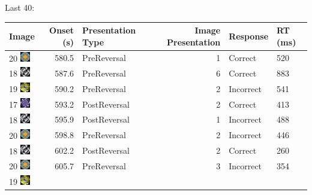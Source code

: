\documentclass[]{article}
\begin{document}
Last 40:

\begin{longtable}[]{@{}lrlrll@{}}
\toprule
Image & Onset (s) & Presentation Type & Image Presentation & Response &
RT (ms)\tabularnewline
\midrule
\endhead
20
\includegraphics[width=0.16670in,height=0.16670in]{../ReversalLearning_20130621/images/abs20.jpg}
& 580.5 & PreReversal & 1 & Correct & 520\tabularnewline
18
\includegraphics[width=0.16670in,height=0.16670in]{../ReversalLearning_20130621/images/abs18.jpg}
& 587.6 & PreReversal & 6 & Correct & 883\tabularnewline
19
\includegraphics[width=0.16670in,height=0.16670in]{../ReversalLearning_20130621/images/abs19.jpg}
& 590.2 & PreReversal & 2 & Incorrect & 541\tabularnewline
17
\includegraphics[width=0.16670in,height=0.16670in]{../ReversalLearning_20130621/images/abs17.jpg}
& 593.2 & PostReversal & 2 & Correct & 413\tabularnewline
18
\includegraphics[width=0.16670in,height=0.16670in]{../ReversalLearning_20130621/images/abs18.jpg}
& 595.9 & PostReversal & 1 & Incorrect & 488\tabularnewline
20
\includegraphics[width=0.16670in,height=0.16670in]{../ReversalLearning_20130621/images/abs20.jpg}
& 598.8 & PreReversal & 2 & Incorrect & 446\tabularnewline
18
\includegraphics[width=0.16670in,height=0.16670in]{../ReversalLearning_20130621/images/abs18.jpg}
& 602.2 & PostReversal & 2 & Correct & 260\tabularnewline
20
\includegraphics[width=0.16670in,height=0.16670in]{../ReversalLearning_20130621/images/abs20.jpg}
& 605.7 & PreReversal & 3 & Incorrect & 354\tabularnewline
19
\includegraphics[width=0.16670in,height=0.16670in]{../ReversalLearning_20130621/images/abs19.jpg}

\end{longtable}
\end{document}
